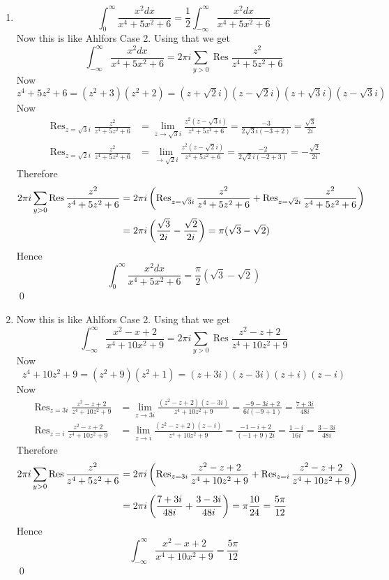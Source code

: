 \documentclass[a4paper, 11pt]{article}
\newcommand{\Res}{\operatorname{Res}}
\begin{document}
{\begin{enumerate}[label=(\alph*)]
		\item $$\int_0^{\infty} \frac{x^2dx}{x^4+5x^2+6}=\frac12\int_{-\infty}^{\infty} \frac{x^2dx}{x^4+5x^2+6}$$Now this is like Ahlfors Case 2. Using that we get $$\int _{-\infty}^{\infty}\frac{x^2dx}{x^4+5x^2+6}=2\pi i \sum_{y>0}\operatorname{Res}\frac{z^2}{z^4+5z^2+6}$$Now $$z^4+5z^2+6=(z^2+3)(z^2+2)=(z+\sqrt{2}i)(z-\sqrt{2}i)(z+\sqrt{3}i)(z-\sqrt{3}i)$$Now \begin{align*}
			\Res_{z=\sqrt{3}i} \frac{z^2}{z^4+5z^2+6} & =\lim\limits_{z\to \sqrt{3}i}\frac{z^2(z-\sqrt{3}i)}{z^4+5z^2+6}=\frac{-3}{2\sqrt{3}i(-3+2)}=\frac{\sqrt{3}}{2i} \\
			\Res_{z=\sqrt{2}i} \frac{z^2}{z^4+5z^2+6} & =\lim\limits_{\to \sqrt{2}i}\frac{z^2(z-\sqrt{2}i)}{z^4+5z^2+6}=\frac{-2}{2\sqrt{2}i(-2+3)}=-\frac{\sqrt{2}}{2i}
		\end{align*}Therefore \begin{align*}
		2\pi i \sum_{y>0}\operatorname{Res}\frac{z^2}{z^4+5z^2+6}& =2\pi i\lt( 	\Res_{z=\sqrt{3}i} \frac{z^2}{z^4+5z^2+6}+	\Res_{z=\sqrt{2}i} \frac{z^2}{z^4+5z^2+6}\rt)\\
		&  = 2\pi i \lt(\frac{\sqrt{3}}{2i} -\frac{\sqrt{2}}{2i}\rt)=\pi(\sqrt{3}-\sqrt{2})
	\end{align*}Hence $$\int_0^{\infty} \frac{x^2dx}{x^4+5x^2+6}=\frac{\pi}{2}(\sqrt{3}-\sqrt{2})$$\qed

\item Now this is like Ahlfors Case 2. Using that we get $$\int_{-\infty}^{\infty}\frac{x^2-x+2}{x^4+10x^2+9}=2\pi i \sum_{y>0}\Res\frac{z^2-z+2}{z^4+10z^2+9}$$Now $$z^4+10z^2+9=(z^2 + 9)(z^2 + 1) = (z + 3i)(z - 3i)(z + i)(z - i)$$Now \begin{align*}
	\Res_{z=3i}\frac{z^2-z+2}{z^4+10z^2+9} & =\lim\limits_{z\to 3i}\frac{(z^2-z+2)(z-3i)}{z^4+10z^2+9}=\frac{-9 - 3i + 2}{6i(-9 + 1)}=\frac{7 + 3i}{48i} \\
	\Res_{z=i} \frac{z^2-z+2}{z^4+10z^2+9} & =\lim\limits_{z\to i} \frac{(z^2-z+2)(z- i)}{z^4+10z^2+9}=\frac{-1 - i +  2}{(-1 + 9)2i}=\frac{1-i}{16i}=\frac{3 - 3i}{48i}
\end{align*}Therefore \begin{align*}
	2\pi i \sum_{y>0}\operatorname{Res}\frac{z^2}{z^4+5z^2+6}& =2\pi i\lt( 	\Res_{z=3i}\frac{z^2-z+2}{z^4+10z^2+9}+	\Res_{z=i} \frac{z^2-z+2}{z^4+10z^2+9}\rt)\\
	&  = 2\pi i \lt(\frac{7 + 3i}{48i}+\frac{3 - 3i}{48i}\rt)=\pi\frac{10}{24}=\frac{5\pi}{12}
\end{align*}Hence $$\int_{-\infty}^{\infty}\frac{x^2-x+2}{x^4+10x^2+9}=\frac{5\pi}{12}$$\qed


\end{enumerate}}
\end{document}
